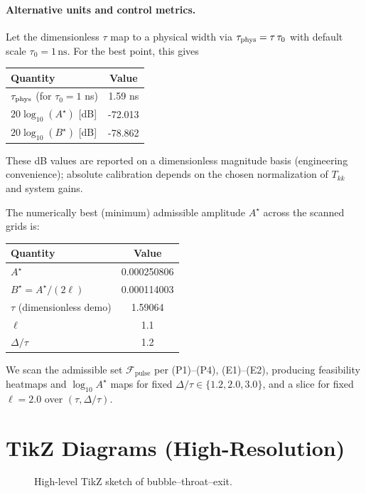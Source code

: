 \documentclass[11pt]{article}
\begin{document}
\paragraph{Alternative units and control metrics.}
Let the dimensionless $\tau$ map to a physical width via $\tau_{\rm phys}=\tau\,\tau_0$ with default scale $\tau_0=1\,\mathrm{ns}$. For the best point, this gives
\begin{center}
\begin{tabular}{l|c}
\hline
Quantity & Value \\ \hline
$\tau_{\rm phys}$ (for $\tau_0\!=\!1$ ns) & 1.59 ns \\
$20\log_{10}(A^\star)$ [dB] & -72.013 \\
$20\log_{10}(B^\star)$ [dB] & -78.862 \\ \hline
\end{tabular}
\end{center}

These dB values are reported on a dimensionless magnitude basis (engineering convenience); absolute calibration depends on the chosen normalization of $T_{kk}$ and system gains.

The numerically best (minimum) admissible amplitude $A^\star$ across the scanned grids is:
\begin{center}
\begin{tabular}{l|c}
\hline
Quantity & Value \\ \hline
$A^\star$ & 0.000250806 \\
$B^\star = A^\star/(2\ell)$ & 0.000114003 \\
$\tau$ (dimensionless demo) & 1.59064 \\
$\ell$ & 1.1 \\
$\Delta/\tau$ & 1.2 \\ \hline
\end{tabular}
\end{center}

We scan the admissible set $\mathcal{F}_{\text{pulse}}$ per (P1)--(P4), (E1)--(E2), producing feasibility heatmaps and $\log_{10}A^\star$ maps for fixed $\Delta/\tau\in\{1.2,2.0,3.0\}$, and a slice for fixed $\ell=2.0$ over $(\tau,\Delta/\tau)$.

\section{TikZ Diagrams (High-Resolution)}
\begin{figure}[h]\centering
{}
\caption{High-level TikZ sketch of bubble--throat--exit.}
\end{figure}
\end{document}
